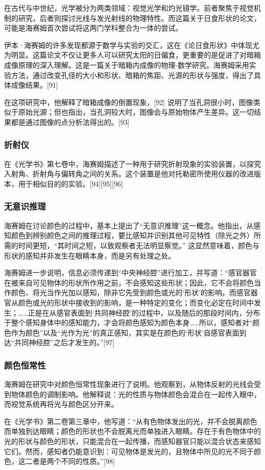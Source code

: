 在古代与中世纪，光学被分为两类领域：视觉光学和灼光镜学。前者聚焦于视觉机制的研究，后者则探讨光线与发光射线的物理特性。而这篇关于日食形状的论文，可能是海赛姆首次尝试将这两门学科整合为一体的尝试。

伊本·海赛姆的许多发现都源于数学与实验的交汇，这在《论日食形状》中体现尤为明显。这篇论文不仅让更多人可以研究太阳的日偏食，更重要的是促进了对暗箱成像原理的深入理解。这是一篇关于暗箱内成像的物理-数学研究。海赛姆采用实验方法，通过改变孔径的大小和形状、暗箱的焦距、光源的形状与强度，得出了具体成像结果。[91]

在这项研究中，他解释了暗箱成像的倒置现象，[92] 说明了当孔洞很小时，图像类似于原始光源；但也指出，当孔洞较大时，图像会与原始物体产生差异。这一切结果都是通过图像的点分析法得出的。[93]
\subsubsection{折射仪}
在《光学书》第七卷中，海赛姆描述了一种用于研究折射现象的实验装置，以探究入射角、折射角与偏转角之间的关系。这个装置是他对托勒密所使用仪器的改进版本，用于相似目的的实验。[94][95][96]
\subsubsection{无意识推理}
海赛姆在讨论颜色的过程中，基本上提出了“无意识推理”这一概念。他指出，从感知颜色到辨别颜色之间的推理过程，要比感知并识别其他可见特性（除光之外）所需的时间更短，“其时间之短，以致观察者无法明显察觉。” 这显然意味着，颜色与形状的感知并非发生在眼睛本身，而是另有处理之处。

海赛姆进一步说明，信息必须传递到“中央神经腔”进行加工，并写道：“感官器官在被来自可见物体的形状所作用之前，不会感知这些形状；因此，它不会将颜色当作颜色、将光当作光加以感知，除非它先受到颜色或光的‘形状’的影响。而感官器官从颜色或光的形状中接收到的影响，是一种特定的变化；而变化必定在时间中发生；……正是在从感官表面到‘共同神经腔’的过程中，以及随后的那段时间内，分布于整个感知身体中的感知能力，才会将颜色感知为颜色本身……所以，感知者对“颜色作为颜色”以及“光作为光”的真正感知，其实是在颜色的‘形状’自感官表面到达“共同神经腔”之后才发生的。”[97]
\subsubsection{颜色恒常性}
海赛姆在研究中对颜色恒常性现象进行了说明。他观察到，从物体反射的光线会受到物体颜色的调制影响。他解释说：光的性质与物体颜色会混合在一起传入眼中，而视觉系统再将光与颜色区分开来。

在《光学书》第二卷第三章中，他写道：“从有色物体发出的光，并不会脱离颜色而单独到达眼睛；颜色的形状也不会脱离光而单独进入眼睛。存在于有色物体中的光的形状与颜色的形状，只能混合在一起传播，而感知器官只能以混合状态来感知它们。然而，感知者仍能意识到：可见物体是发光的，且物体中所见的光不同于颜色，这二者是两个不同的性质。”[98]
